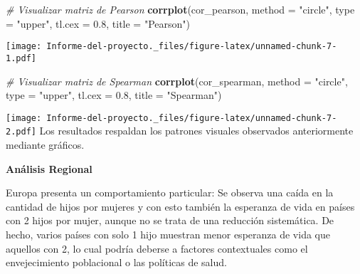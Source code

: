 \documentclass[
]{article}
\newenvironment{Shaded}{\begin{snugshade}}{\end{snugshade}}
\newcommand{\AttributeTok}[1]{\textcolor[rgb]{0.13,0.29,0.53}{#1}}
\newcommand{\CommentTok}[1]{\textcolor[rgb]{0.56,0.35,0.01}{\textit{#1}}}
\newcommand{\FloatTok}[1]{\textcolor[rgb]{0.00,0.00,0.81}{#1}}
\newcommand{\FunctionTok}[1]{\textcolor[rgb]{0.13,0.29,0.53}{\textbf{#1}}}
\newcommand{\NormalTok}[1]{#1}
\newcommand{\StringTok}[1]{\textcolor[rgb]{0.31,0.60,0.02}{#1}}
\begin{document}
\begin{Shaded}
\begin{Highlighting}[]
\CommentTok{\# Visualizar matriz de Pearson}
\FunctionTok{corrplot}\NormalTok{(cor\_pearson, }\AttributeTok{method =} \StringTok{"circle"}\NormalTok{, }\AttributeTok{type =} \StringTok{"upper"}\NormalTok{, }\AttributeTok{tl.cex =} \FloatTok{0.8}\NormalTok{, }\AttributeTok{title =} \StringTok{"Pearson"}\NormalTok{)}
\end{Highlighting}
\end{Shaded}

\texttt{[image: Informe-del-proyecto.\_files/figure-latex/unnamed-chunk-7-1.pdf]}

\begin{Shaded}
\begin{Highlighting}[]
\CommentTok{\# Visualizar matriz de Spearman}
\FunctionTok{corrplot}\NormalTok{(cor\_spearman, }\AttributeTok{method =} \StringTok{"circle"}\NormalTok{, }\AttributeTok{type =} \StringTok{"upper"}\NormalTok{, }\AttributeTok{tl.cex =} \FloatTok{0.8}\NormalTok{, }\AttributeTok{title =} \StringTok{"Spearman"}\NormalTok{)}
\end{Highlighting}
\end{Shaded}

\texttt{[image: Informe-del-proyecto.\_files/figure-latex/unnamed-chunk-7-2.pdf]}
Los resultados respaldan los patrones visuales observados anteriormente
mediante gráficos.

\textbf{Análisis Regional}

Europa presenta un comportamiento particular: Se observa una caída en la
cantidad de hijos por mujeres y con esto también la esperanza de vida en
países con 2 hijos por mujer, aunque no se trata de una reducción
sistemática. De hecho, varios países con solo 1 hijo muestran menor
esperanza de vida que aquellos con 2, lo cual podría deberse a factores
contextuales como el envejecimiento poblacional o las políticas de
salud.
\end{document}
